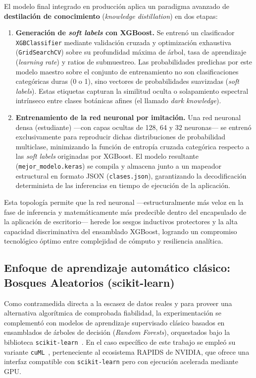 El modelo final integrado en producción aplica un paradigma avanzado de \textbf{destilación de conocimiento} (\textit{knowledge distillation}) en dos etapas:

\begin{enumerate}
    \item \textbf{Generación de \textit{soft labels} con XGBoost.} Se entrenó un clasificador \texttt{XGBClassifier} mediante validación cruzada y optimización exhaustiva (\texttt{GridSearchCV}) sobre su profundidad máxima de árbol, tasa de aprendizaje (\textit{learning rate}) y ratios de submuestreo. Las probabilidades predichas por este modelo maestro sobre el conjunto de entrenamiento no son clasificaciones categóricas duras (0 o 1), sino vectores de probabilidades suavizadas (\textit{soft labels}). Estas etiquetas capturan la similitud oculta o solapamiento espectral intrínseco entre clases botánicas afines (el llamado \textit{dark knowledge}).

    \item \textbf{Entrenamiento de la red neuronal por imitación.} Una red neuronal densa (estudiante) ---con capas ocultas de 128, 64 y 32 neuronas--- se entrenó exclusivamente para reproducir dichas distribuciones de probabilidad multiclase, minimizando la función de entropía cruzada categórica respecto a las \textit{soft labels} originadas por XGBoost. El modelo resultante (\texttt{mejor\_modelo.keras}) se compila y almacena junto a un mapeador estructural en formato JSON (\texttt{clases.json}), garantizando la decodificación determinista de las inferencias en tiempo de ejecución de la aplicación.
\end{enumerate}

Esta topología permite que la red neuronal ---estructuralmente más veloz en la fase de inferencia y matemáticamente más predecible dentro del encapsulado de la aplicación de escritorio--- herede los sesgos inductivos protectores y la alta capacidad discriminativa del ensamblado XGBoost, logrando un compromiso tecnológico óptimo entre complejidad de cómputo y resiliencia analítica.

\subsection*{Enfoque de aprendizaje automático clásico: Bosques Aleatorios (scikit-learn)}

Como contramedida directa a la escasez de datos reales y para proveer una alternativa algorítmica de comprobada fiabilidad, la experimentación se complementó con modelos de aprendizaje supervisado clásico basados en ensamblados de árboles de decisión (\textit{Random Forests}), orquestados bajo la biblioteca \texttt{scikit-learn}~\cite{pedregosa2011sklearn}. En el caso específico de este trabajo se empleó su variante \texttt{cuML}~\cite{rapids_cuml}, perteneciente al ecosistema RAPIDS de NVIDIA, que ofrece una interfaz compatible con \texttt{scikit-learn} pero con ejecución acelerada mediante GPU.

